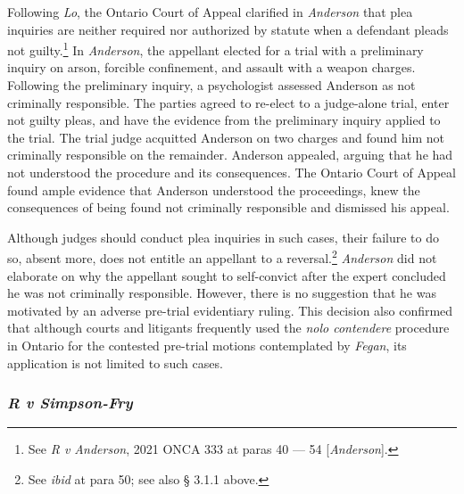 Following \textit{Lo}, the Ontario Court of Appeal clarified in \textit{Anderson} that plea inquiries are neither required nor authorized by statute when a defendant pleads not guilty.\footnote{See \textit{R v Anderson}, 2021 ONCA 333 at paras 40 — 54 [\textit{Anderson}].} In \textit{Anderson}, the appellant elected for a trial with a preliminary inquiry on arson, forcible confinement, and assault with a weapon charges. Following the preliminary inquiry, a psychologist assessed Anderson as not criminally responsible. The parties agreed to re-elect to a judge-alone trial, enter not guilty pleas, and have the evidence from the preliminary inquiry applied to the trial. The trial judge acquitted Anderson on two charges and found him not criminally responsible on the remainder. Anderson appealed, arguing that he had not understood the procedure and its consequences. The Ontario Court of Appeal found ample evidence that Anderson understood the proceedings, knew the consequences of being found not criminally responsible and dismissed his appeal. 

Although judges should conduct plea inquiries in such cases, their failure to do so, absent more, does not entitle an appellant to a reversal.\footnote{See \textit{ibid} at para 50; see also § 3.1.1 above.} \textit{Anderson} did not elaborate on why the appellant sought to self-convict after the expert concluded he was not criminally responsible. However, there is no suggestion that he was motivated by an adverse pre-trial evidentiary ruling. This decision also confirmed that although courts and litigants frequently used the \textit{nolo contendere} procedure in Ontario for the contested pre-trial motions contemplated by \textit{Fegan}, its application is not limited to such cases.

\subsubsection{\textit{R v Simpson-Fry}}

